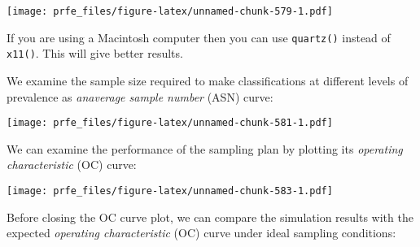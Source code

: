 \documentclass[
  12pt,
  a4paper]{book}
\newenvironment{Shaded}{\begin{snugshade}}{\end{snugshade}}
\newcommand{\AttributeTok}[1]{\textcolor[rgb]{0.77,0.63,0.00}{#1}}
\newcommand{\ConstantTok}[1]{\textcolor[rgb]{0.00,0.00,0.00}{#1}}
\newcommand{\DecValTok}[1]{\textcolor[rgb]{0.00,0.00,0.81}{#1}}
\newcommand{\FloatTok}[1]{\textcolor[rgb]{0.00,0.00,0.81}{#1}}
\newcommand{\FunctionTok}[1]{\textcolor[rgb]{0.00,0.00,0.00}{#1}}
\newcommand{\NormalTok}[1]{#1}
\newcommand{\SpecialCharTok}[1]{\textcolor[rgb]{0.00,0.00,0.00}{#1}}
\newcommand{\StringTok}[1]{\textcolor[rgb]{0.31,0.60,0.02}{#1}}
\begin{document}
\texttt{[image: prfe\_files/figure-latex/unnamed-chunk-579-1.pdf]}

If you are using a Macintosh computer then you can use \texttt{quartz()} instead of \texttt{x11()}. This will give better results.

We examine the sample size required to make classifications at different levels of prevalence as \emph{anaverage sample number} (ASN) curve:

\begin{Shaded}
\end{Shaded}

\texttt{[image: prfe\_files/figure-latex/unnamed-chunk-581-1.pdf]}

We can examine the performance of the sampling plan by plotting its \emph{operating characteristic} (OC) curve:

\begin{Shaded}
\end{Shaded}

\texttt{[image: prfe\_files/figure-latex/unnamed-chunk-583-1.pdf]}

Before closing the OC curve plot, we can compare the simulation results with the expected \emph{operating characteristic} (OC) curve under ideal sampling conditions:

\begin{Shaded}
\end{Shaded}
\end{document}
